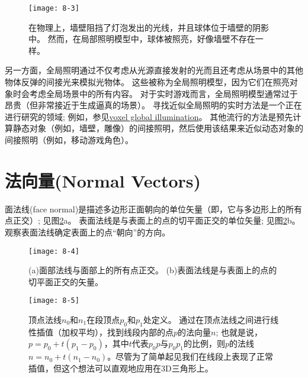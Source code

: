 \begin{figure}[h]
    \texttt{[image: 8-3]}
    \centering
    \caption{在物理上，墙壁阻挡了灯泡发出的光线，并且球体位于墙壁的阴影中。 然而，在局部照明模型中，球体被照亮，好像墙壁不存在一样。}
    \label{fig:8-3}
\end{figure}

\begin{flushleft}
另一方面，全局照明通过不仅考虑从光源直接发射的光而且还考虑从场景中的其他物体反弹的间接光来模拟光物体。 这些被称为全局照明模型，因为它们在照亮对象时会考虑全局场景中的所有内容。 对于实时游戏而言，全局照明模型通常过于昂贵（但非常接近于生成逼真的场景）。 寻找近似全局照明的实时方法是一个正在进行研究的领域; 例如，参见\href{http://on-demand.gputechconf.com/gtc/2014/presentations/S4552-rt-voxel-based-global-illumination-gpus.pdf}{\textcolor{linkColor}{voxel global illumination}}。 其他流行的方法是预先计算静态对象（例如，墙壁，雕像）的间接照明，然后使用该结果来近似动态对象的间接照明（例如，移动游戏角色）。\\
\end{flushleft}

\section{法向量(Normal Vectors)}
\begin{flushleft}
面法线(face normal)是描述多边形正面朝向的单位矢量（即，它与多边形上的所有点正交）; 见图\ref{fig:8-4}a。 表面法线是与表面上的点的切平面正交的单位矢量; 见图\ref{fig:8-4}b。 观察表面法线确定表面上的点“朝向”的方向。\\
\end{flushleft}

\begin{figure}[h]
    \texttt{[image: 8-4]}
    \centering
    \caption{(a)面部法线与面部上的所有点正交。 (b)表面法线是与表面上的点的切平面正交的矢量。}
    \label{fig:8-4}
\end{figure}

\begin{figure}[h]
    \texttt{[image: 8-5]}
    \centering
    \caption{顶点法线$n_{0}$和$n_{1}$在段顶点$p_{0}$和$p_{1}$处定义。 通过在顶点法线之间进行线性插值（加权平均），找到线段内部的点$p$的法向量$n$; 也就是说，$p=p_{0}+t(p_{1}-p_{0})$，其中$t$代表$p_{0}p$与$p_{0}p_{1}$的比例，则$p$的法线$n=n_{0} + t(n_{1}-n_{0})$。尽管为了简单起见我们在线段上表现了正常插值，但这个想法可以直观地应用在3D三角形上。}
    \label{fig:8-5}
\end{figure}

